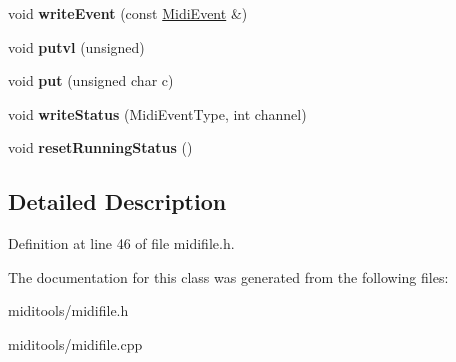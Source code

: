 \begin{DoxyCompactItemize}
\item 
\mbox{\label{class_midi_file_adf3c23a612f9d2e2d5f72c17085b7f7e}} 
void {\bfseries write\+Event} (const \hyperlink{class_midi_event}{Midi\+Event} \&)
\item 
\mbox{\label{class_midi_file_a74a8d5c857a669a8fa7334bbf30c40e5}} 
void {\bfseries putvl} (unsigned)
\item 
\mbox{\label{class_midi_file_a37cee5861163503f2b051de0307a61f5}} 
void {\bfseries put} (unsigned char c)
\item 
\mbox{\label{class_midi_file_ab9f67f681e39817a250015f8428d8f84}} 
void {\bfseries write\+Status} (Midi\+Event\+Type, int channel)
\item 
\mbox{\label{class_midi_file_a42abc6c1a00e6d83cbf17aa768808f51}} 
void {\bfseries reset\+Running\+Status} ()
\end{DoxyCompactItemize}


\subsection{Detailed Description}


Definition at line 46 of file midifile.\+h.



The documentation for this class was generated from the following files\+:\begin{DoxyCompactItemize}
\item 
miditools/midifile.\+h\item 
miditools/midifile.\+cpp\end{DoxyCompactItemize}
